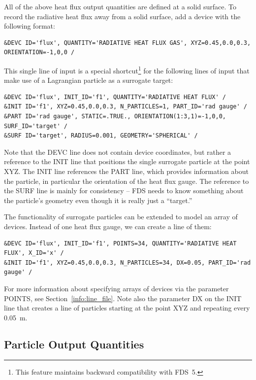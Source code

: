 \documentclass[11pt]{book}
\begin{document}
All of the above heat flux output quantities are defined at a solid surface. To record the radiative heat flux away from a solid surface, add a device with the following format:
\begin{lstlisting}
&DEVC ID='flux', QUANTITY='RADIATIVE HEAT FLUX GAS', XYZ=0.45,0.0,0.3, ORIENTATION=-1,0,0 /
\end{lstlisting}
This single line of input is a special shortcut\footnote{This feature maintains backward compatibility with FDS~5.} for the following lines of input that make use of a Lagrangian particle as a surrogate target:
\begin{lstlisting}
&DEVC ID='flux', INIT_ID='f1', QUANTITY='RADIATIVE HEAT FLUX' /
&INIT ID='f1', XYZ=0.45,0.0,0.3, N_PARTICLES=1, PART_ID='rad gauge' /
&PART ID='rad gauge', STATIC=.TRUE., ORIENTATION(1:3,1)=-1,0,0, SURF_ID='target' /
&SURF ID='target', RADIUS=0.001, GEOMETRY='SPHERICAL' /
\end{lstlisting}
Note that the {\ct DEVC} line does not contain device coordinates, but rather a reference to the {\ct INIT} line that positions the single surrogate particle at the point {\ct XYZ}. The {\ct INIT} line references the {\ct PART} line, which provides information about the particle, in particular the orientation of the heat flux gauge. The reference to the {\ct SURF} line is mainly for consistency -- FDS needs to know something about the particle's geometry even though it is really just a ``target.''

The functionality of surrogate particles can be extended to model an array of devices. Instead of one heat flux gauge, we can create a line of them:
\begin{lstlisting}
&DEVC ID='flux', INIT_ID='f1', POINTS=34, QUANTITY='RADIATIVE HEAT FLUX', X_ID='x' /
&INIT ID='f1', XYZ=0.45,0.0,0.3, N_PARTICLES=34, DX=0.05, PART_ID='rad gauge' /
\end{lstlisting}
For more information about specifying arrays of devices via the parameter {\ct POINTS}, see Section~\ref{info:line_file}. Note also the parameter {\ct DX} on the {\ct INIT} line that creates a line of particles starting at the point {\ct XYZ} and repeating every 0.05~m.










\subsection{Particle Output Quantities}
\label{info:part_output}
\end{document}
